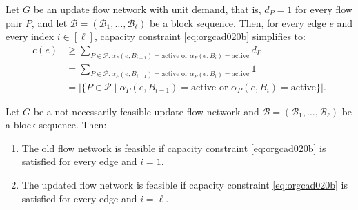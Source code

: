 \documentclass[fontsize=11pt,paper=a4]{book}
\begin{document}
\begin{remark}
Let \(G\) be an update flow network with unit demand, that is, \(d_P=1\) for every flow pair \(P\), and let \(\mathcal{B}=(\mathscr{B}_1,\dots,\mathscr{B}_{\ell})\) be a block sequence.
Then, for every edge \(e\) and every index \(i\in[\ell]\), capacity constraint \ref{eq:orgcad020b} simplifies to:
\begin{align*}
c(e)
&\geq\sum_{P\in\mathcal{P}:\alpha_P(e,B_{i-1})=\mathrm{active}\text{ or }\alpha_P(e,B_i)=\mathrm{active}}d_P\\
&=\sum_{P\in\mathcal{P}:\alpha_P(e,B_{i-1})=\mathrm{active}\text{ or }\alpha_P(e,B_i)=\mathrm{active}}1\\
&=\lvert\{P\in\mathcal{P}\mid\alpha_P(e,B_{i-1})=\mathrm{active}\text{ or }\alpha_P(e,B_i)=\mathrm{active}\}\rvert.
\end{align*}
\label{org32d76cc}
\end{remark}

\begin{lem}
Let \(G\) be a not necessarily feasible update flow network and \(\mathcal{B}=(\mathscr{B}_1,\dots,\mathscr{B}_{\ell})\) be a block sequence. Then:

\begin{enumerate}
\item \label{itm:lem-update-flow-network-feasible-if-1}
The old flow network is feasible if capacity constraint \ref{eq:orgcad020b} is satisfied for every edge and \(i=1\).

\item \label{itm:lem-update-flow-network-feasible-if-2}
The updated flow network is feasible if capacity constraint \ref{eq:orgcad020b} is satisfied for every edge and \(i=\ell\).
\end{enumerate}
\label{orgcb7de4b}
\end{lem}
\end{document}
